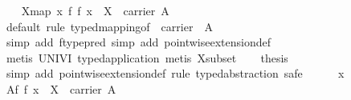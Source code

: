 \begin{isabellebody}
\isanewline
\ \ \isamarkupfalse%
\ X{}map{}\ {}{}x{}\ {}{}{}f{}\ f\ x{}\ {}\ X{}\ {}\ carrier\ A{}\isanewline
\ \ \ \ \isamarkupfalse%
\ {}default{}\ rule\ typed{}mapping{}of\ {}\ {}carrier\ {}{}\ A{}{}{}{}\isanewline
\ \ \ \ \isamarkupfalse%
\ {}simp\ add{}\ ftype{}pred{}\ simp\ add{}\ pointwise{}extension{}def{}\isanewline
\ \ \ \ \isamarkupfalse%
\ {}metis\ UNIV{}I\ typed{}application{}\ metis\ X{}subset{}\isanewline
\isanewline
\ \ \isamarkupfalse%
\ {}thesis\isanewline
\ \ \isamarkupfalse%
\ {}simp\ add{}\ pointwise{}extension{}def{}\ rule\ typed{}abstraction{}\ safe{}\isanewline
\ \ \ \ \isamarkupfalse%
\ x\ \isamarkupfalse%
\ {}{}\isactrlbsub Af{}\ f\ x{}\ {}\ X{}\ {}\ carrier\ A{}\isanewline

\end{isabellebody}
